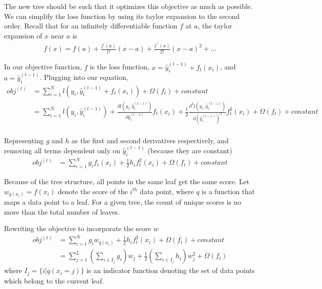 \documentclass[../statistical_learning_notes.tex]{subfiles}
\begin{document}
The new tree should be such that it optimizes this objective as much as possible. We can simplify the loss function by using its taylor expansion to the second order. Recall that for an infinitely differentiable function $f$ at $a$, the taylor expansion of $x$ near $a$ is
\begin{align*}
    f(x) = f(a) + \frac{f^{\prime}(a)}{1!}(x-a) + \frac{f^{\prime \prime}(a)}{2!}(x-a)^{2} + \ldots
\end{align*}

In our objective function, $f$ is the loss function, $x = \hat{y}^{(t-1)}_{i} + f_{t}(x_{i})$, and $a = \hat{y}^{(t-1)}_{i}$. Plugging into our equation,
\begin{align*}
    obj^{(t)} &= \sum_{i=1}^{N} l(y_{i}, \hat{y}^{(t-1)}_{i} + f_{t}(x_{i})) + \Omega(f_{t}) + constant\\
    &= \sum_{i=1}^{N} l(y_{i}, \hat{y}^{(t-1)}_{i}) + \frac{\partial l(y_{i}, \hat{y}^{(t-1)}_{i})}{\partial \hat{y}^{(t-1)}_{i}} f_{t}(x_{i}) + \frac{1}{2} \frac{\partial^{2} l(y_{i}, \hat{y}^{(t-1)}_{i})}{\partial (\hat{y}^{(t-1)}_{i})^{2}} f_{t}^{2}(x_{i}) + \Omega(f_{t}) + constant\\
\end{align*}

Representing $g$ and $h$ as the first and second derivatives respectively, and removing all terms dependent only on $\hat{y}^{(t-1)}_{i}$ (because they are constant)
\begin{align*}
    obj^{(t)} &= \sum_{i=1}^{N} g_{i} f_{t}(x_{i}) + \frac{1}{2} h_{i} f_{t}^{2}(x_{i}) + \Omega(f_{t}) + constant
\end{align*}

Because of the tree structure, all points in the same leaf get the same score. Let $w_{q(x_{i})} = f(x_{i})$ denote the score of the $i^{th}$ data point, where $q$ is a function that maps a data point to a leaf. For a given tree, the count of unique scores is no more than the total number of leaves.

Rewriting the objective to incorporate the score $w$
\begin{align*}
    obj^{(t)} &= \sum_{i=1}^{N} g_{i} w_{q(x_{i})} + \frac{1}{2} h_{i} f_{t}^{2}(x_{i}) + \Omega(f_{t}) + constant\\
    &= \sum_{j=1}^{L} (\sum_{i \in I_{j}} g_{i})w_{j} + \frac{1}{2}(\sum_{i \in I_{j}} h_{i})w^{2}_{j} + \Omega(f_{t})
\end{align*}
where $I_{j} = \{i|q(x_{i} = j)\}$ is an indicator function denoting the set of data points which belong to the current leaf.\newline
\end{document}
